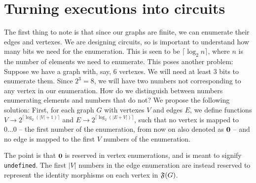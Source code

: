 \documentclass[submission,copyright,creativecommons,sharealike,noncommercial]{eptcs}
\begin{document}
\section{Turning executions into circuits}\label{sec: turning executions into circuits}
%
The first thing to note is that since our graphs are finite, we can 
enumerate their edges and vertexes. We are designing circuits, 
so is important to understand how many bits we need for the 
enumeration. This is seen to be $\lceil \log_2{n} \rceil$, where 
$n$ is the number of elements we need to enumerate. This poses 
another problem: Suppose we have a graph with, say, $6$ 
vertexes. We will need at least $3$ bits to enumerate them. 
Since $2^3 = 8$, we will have two numbers not corresponding 
to any vertex in our enumeration. How do we distinguish 
between numbers enumerating elements and numbers that do 
not? We propose the following solution: First, for each graph $G$ 
with vertexes $V$ and edges $E$, we define functions
$V \to 2^{\lceil \log_2 (|V|+1) \rceil}$ and 
$E \to 2^{\lceil \log_2 (|E+V|) \rceil}$, such that no vertex is 
mapped to $0 \dots 0$ -- the first number of the enumeration, 
from now on also denoted as $\textbf{0}$ -- and no edge is mapped 
to the first $V$ numbers of the enumeration.

The point is that $\textbf{0}$ is reserved in vertex enumerations, 
and is meant to signify \texttt{undefined}. The first $|V|$ numbers 
in the edge enumeration are instead reserved to represent the 
identity morphisms on each vertex in $\mathfrak{F}(G)$. 
\end{document}
